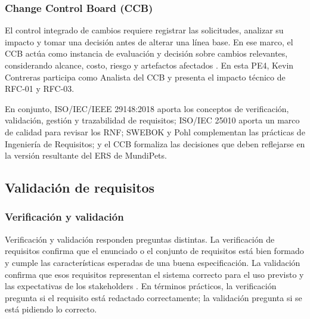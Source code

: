 \documentclass[journal,onecolumn]{IEEEtran}
\begin{document}
	\subsubsection{Change Control Board (CCB)}
	
	El control integrado de cambios requiere registrar las solicitudes, analizar su impacto y tomar
	una decisión antes de alterar una línea base. En ese marco, el CCB actúa como instancia de
	evaluación y decisión sobre cambios relevantes, considerando alcance, costo, riesgo y artefactos
	afectados \cite{pmbok7}. En esta PE4, Kevin Contreras participa como Analista del CCB y presenta
	el impacto técnico de RFC-01 y RFC-03.
	
	En conjunto, ISO/IEC/IEEE 29148:2018 aporta los conceptos de verificación, validación, gestión y
	trazabilidad de requisitos; ISO/IEC 25010 aporta un marco de calidad para revisar los RNF; SWEBOK
	y Pohl complementan las prácticas de Ingeniería de Requisitos; y el CCB formaliza las decisiones
	que deben reflejarse en la versión resultante del ERS de MundiPets.
	
	\subsection{Validación de requisitos}
	
	\subsubsection{Verificación y validación}
	
	Verificación y validación responden preguntas distintas. La verificación de requisitos confirma
	que el enunciado o el conjunto de requisitos está bien formado y cumple las características
	esperadas de una buena especificación. La validación confirma que esos requisitos representan el
	sistema correcto para el uso previsto y las expectativas de los stakeholders \cite{iso29148}. En
	términos prácticos, la verificación pregunta si el requisito está redactado correctamente; la
	validación pregunta si se está pidiendo lo correcto.
	
\end{document}
